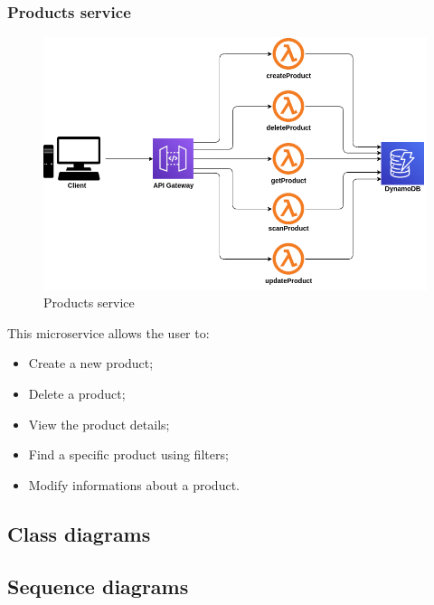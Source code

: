 \subsubsection{Products service}
\begin{figure}[!h]
    \vspace{5px}
    \includegraphics[scale=0.5]{../../../../Images/Diagrammi/maintainerManual/productService.png}
    \centering
    \caption{Products service}
\end{figure}
This microservice allows the user to:
\begin{itemize}
    \item Create a new product;
    \item Delete a product;
    \item View the product details;
    \item Find a specific product using filters;
    \item Modify informations about a product.
\end{itemize}

\subsection{Class diagrams}
\subsection{Sequence diagrams}